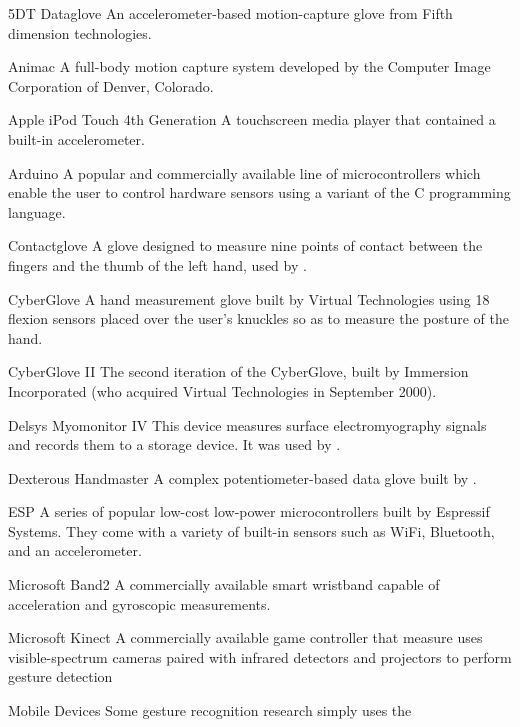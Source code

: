 \begin{Nomencl}[1cm]
    \item[5DT Dataglove] An accelerometer-based motion-capture glove from Fifth dimension technologies.
    \item[Animac] A full-body motion capture system developed by the Computer
        Image Corporation of Denver, Colorado.
    \item[Apple iPod Touch 4th Generation] A touchscreen media player that contained a built-in accelerometer.
    \item[Arduino] A popular and commercially available line of
        microcontrollers which enable the user to control hardware sensors
        using a variant of the C programming language.
    \item[Contactglove] A glove designed to measure nine points of contact
        between the fingers and the thumb of the left hand, used by
        \cite{felsGloveTalkIIaNeuralnetworkInterface1998}.
    \item[CyberGlove] A hand measurement glove built by Virtual Technologies
        using 18 flexion sensors placed over the user's knuckles so as to
        measure the posture of the hand.
    \item[CyberGlove II] The second iteration of the CyberGlove, built by
        Immersion Incorporated (who acquired Virtual Technologies in September
        2000).
    \item[Delsys Myomonitor IV] This device measures surface electromyography
        signals and records them to a storage device. It was used by
        \cite{zhangHandGestureRecognition2009}.
    \item[Dexterous Handmaster] A complex potentiometer-based data glove built
        by \cite{jacobsenUTAHDextrousHand1984}.
    \item[ESP] A series of popular low-cost low-power microcontrollers built by
        Espressif Systems. They come with a variety of built-in sensors such as
        WiFi, Bluetooth, and an accelerometer.
    \item[Microsoft Band2] A commercially available smart wristband capable of
        acceleration and gyroscopic measurements.
    \item[Microsoft Kinect] A commercially available game controller that
        measure uses visible-spectrum cameras paired with infrared detectors
        and projectors to perform gesture detection
    \item[Mobile Devices] Some gesture recognition research simply uses the

\end{Nomencl}
